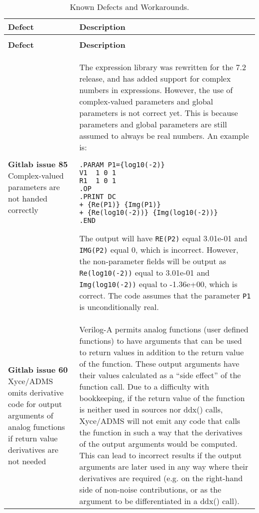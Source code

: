 {
\small

\begin{longtable}[h] {>{\raggedright\small}m{2in}|>{\raggedright\let\\\tabularnewline\small}m{3.5in}}
  \caption{Known Defects and Workarounds.} \\ \hline
  \rowcolor{XyceDarkBlue} \color{white}\textbf{Defect} & \color{white}\textbf{Description} \\ \hline \endfirsthead
  \caption[]{Known Defects and Workarounds.} \\ \hline
  \rowcolor{XyceDarkBlue} \color{white}\textbf{Defect} & \color{white}\textbf{Description}
  \\ \hline \endhead

%
%

\textbf{Gitlab issue 85} Complex-valued parameters are not handed correctly &
The \Xyce{} expression library was rewritten for the 7.2 release, and
has added support for complex numbers in expressions.  However, the
use of complex-valued parameters and global parameters is not correct
yet.  This is because parameters and global parameters are still
assumed to always be real numbers.  An example is:
\begin{verbatim}
.PARAM P1={log10(-2)}
V1  1 0 1
R1  1 0 1
.OP
.PRINT DC
+ {Re(P1)} {Img(P1)}
+ {Re(log10(-2))} {Img(log10(-2))}
.END
\end{verbatim}
The output will have \texttt{RE(P2)} equal 3.01e-01 and \texttt{IMG(P2)}
  equal 0, which is incorrect.  However,  the non-parameter fields will be
  output as \texttt{Re(log10(-2))} equal to
  3.01e-01 and \texttt{Img(log10(-2))} equal to -1.36e+00, which is correct.
  The code assumes that the parameter \texttt{P1} is unconditionally real.
\\ \hline

\textbf{Gitlab issue 60} Xyce/ADMS omits derivative code for output arguments of analog functions if return value derivatives are not needed &
Verilog-A permits analog functions (user defined functions) to have
arguments that can be used to return values in addition to the return
value of the function.  These output arguments have their values
calculated as a ``side effect'' of the function call.  Due to a
difficulty with bookkeeping, if the return value of the function is
neither used in sources nor ddx() calls, Xyce/ADMS will not emit any
code that calls the function in such a way that the derivatives of the
output arguments would be computed.  This can lead to incorrect
results if the output arguments are later used in any way where their
derivatives are required (e.g. on the right-hand side of non-noise
contributions, or as the argument to be differentiated in a ddx()
call).


\end{longtable}}
